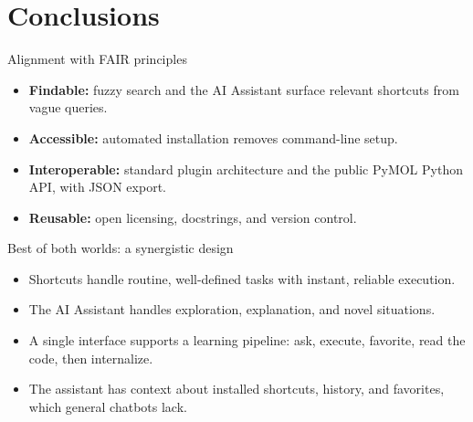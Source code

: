 \section{Conclusions}

\begin{frame}{Alignment with FAIR principles}
  \begin{itemize}[font=$\bullet$\scshape\bfseries]
    \item \textbf{Findable:} fuzzy search and the AI Assistant surface
          relevant shortcuts from vague queries.
    \item \textbf{Accessible:} automated installation removes command-line
          setup.
    \item \textbf{Interoperable:} standard plugin architecture and the public
          PyMOL Python API, with JSON export.
    \item \textbf{Reusable:} open licensing, docstrings, and version control.
  \end{itemize}
\end{frame}

\begin{frame}{Best of both worlds: a synergistic design}
  \begin{itemize}[font=$\bullet$\scshape\bfseries]
    \item Shortcuts handle routine, well-defined tasks with instant, reliable
          execution.
    \item The AI Assistant handles exploration, explanation, and novel
          situations.
    \item A single interface supports a learning pipeline:
          ask, execute, favorite, read the code, then internalize.
    \item The assistant has context about installed shortcuts, history, and
          favorites, which general chatbots lack.
  \end{itemize}
\end{frame}



